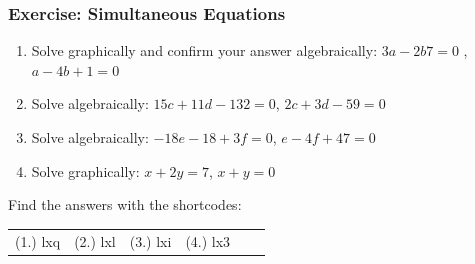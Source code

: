             \subsubsection{ Exercise: Simultaneous Equations }
            \nopagebreak
        \label{m39257*id161286}\begin{enumerate}[noitemsep, label=\textbf{\arabic*}. ] 
            \label{m39257*uid98}\item Solve graphically and confirm your answer algebraically:
$3a-2b7=0$ , $a-4b+1=0$\hspace{1ex}        
\label{m39257*uid99}\item Solve algebraically: $15c+11d-132=0$, $2c+3d-59=0$\hspace{1ex}        
\label{m39257*uid100}\item Solve algebraically: $-18e-18+3f=0$, $e-4f+47=0$\hspace{1ex}        
\label{m39257*uid101}\item Solve graphically: $x+2y=7$, $x+y=0$\hspace{1ex}        
\end{enumerate}
\label{m39257**end}
\par {} Find the answers with the shortcodes:
 \par \begin{tabular}[h]{cccccc}
 (1.) lxq  &  (2.) lxl  &  (3.) lxi  &  (4.) lx3  & \end{tabular}
